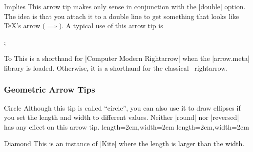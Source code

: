 \begin{arrowtipsimple}{Implies}
    This arrow tip makes only sense in conjunction with the |double| option.
    The idea is that you attach it to a double line to get something that looks
    like \TeX's \texttt{\string\implies} arrow ($\implies$). A typical use of
    this arrow tip is
\begin{codeexample}[preamble={\usetikzlibrary{graphs}}]
\tikz {};
\end{codeexample}
    \begin{arrowexamples}
        \arrowexampledouble[]
        \arrowexampledouble[red]
    \end{arrowexamples}
\end{arrowtipsimple}

\begin{arrowtipsimple}{To}
    This is a shorthand for  |Computer Modern Rightarrow| when the |arrow.meta|
    library is loaded. Otherwise, it is a shorthand for the classical
    \tikzname\ rightarrow.
\end{arrowtipsimple}


\subsubsection{Geometric Arrow Tips}

\begin{arrowtip}{Circle}{
    Although this tip is called ``circle'', you can also use it to draw
    ellipses if you set the length and width to different values. Neither
    |round| nor |reversed| has any effect on this arrow tip.
}%
{length=2cm,width=2cm}%
{length=2cm,width=2cm}

    \begin{arrowexamples}
        \arrowexample[]
        \arrowexampledup[sep]
        \arrowexampledupdot[sep]
        \arrowexample[open]
        \arrowexample[length=3pt]
        \arrowexample[slant=.3]
        \arrowexample[left]
        \arrowexample[right]
        \arrowexample[red]
    \end{arrowexamples}
\end{arrowtip}

\begin{arrowtipsimple}{Diamond}
    This is an instance of |Kite| where the length is larger than the width.
    \begin{arrowexamples}
        \arrowexample[]
        \arrowexampledup[]
        \arrowexampledupdot[]
        \arrowexample[open]
        \arrowexample[length=10pt]
        \arrowexample[round]
        \arrowexample[slant=.3]
        \arrowexample[left]
        \arrowexample[right]
        \arrowexample[red]
        \arrowexample[fill=red!50]
    \end{arrowexamples}
\end{arrowtipsimple}

